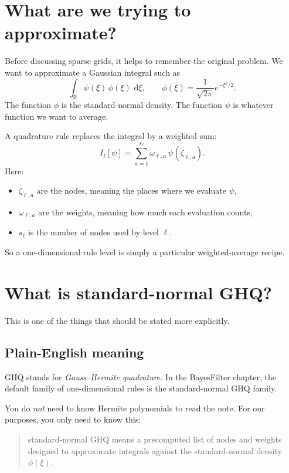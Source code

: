 \documentclass[11pt]{article}
\newcommand{\R}{\mathbb R}
\newcommand{\dd}{\,\mathrm d}
\begin{document}
\section{What are we trying to approximate?}
\label{sec:basic-goal}

Before discussing sparse grids, it helps to remember the original problem.  We
want to approximate a Gaussian integral such as
\begin{equation}
  \int_{\R} \psi(\xi)\,\phi(\xi)\,\dd\xi,
  \qquad
  \phi(\xi)=\frac{1}{\sqrt{2\pi}}e^{-\xi^2/2}.
  \label{eq:basic-gaussian-integral}
\end{equation}
The function \(\phi\) is the standard-normal density.  The function \(\psi\) is
whatever function we want to average.

A quadrature rule replaces the integral by a weighted sum:
\begin{equation}
  I_\ell[\psi]
  =
  \sum_{a=1}^{s_\ell}\omega_{\ell,a}\,\psi(\zeta_{\ell,a}).
  \label{eq:generic-1d-rule}
\end{equation}
Here:
\begin{itemize}[leftmargin=0.28in]
  \item \(\zeta_{\ell,a}\) are the nodes, meaning the places where we evaluate
  \(\psi\),
  \item \(\omega_{\ell,a}\) are the weights, meaning how much each evaluation
  counts,
  \item \(s_\ell\) is the number of nodes used by level \(\ell\).
\end{itemize}

So a one-dimensional rule level is simply a particular weighted-average recipe.

\section{What is standard-normal GHQ?}
\label{sec:standard-normal-ghq}

This is one of the things that should be stated more explicitly.

\subsection{Plain-English meaning}

GHQ stands for \emph{Gauss--Hermite quadrature}.  In the BayesFilter chapter, the
default family of one-dimensional rules is the standard-normal GHQ family.

You do \emph{not} need to know Hermite polynomials to read the note.  For our
purposes, you only need to know this:
\begin{quote}
standard-normal GHQ means a precomputed list of nodes and weights designed to
approximate integrals against the standard-normal density \(\phi(\xi)\).
\end{quote}
\end{document}
